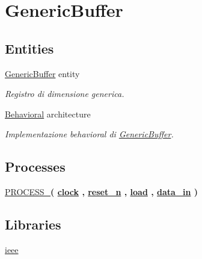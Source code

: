 \hypertarget{group___generic_buffer}{}\section{Generic\+Buffer}
\label{group___generic_buffer}
\subsection*{Entities}
\begin{DoxyCompactItemize}
\item 
\hyperlink{class_generic_buffer}{Generic\+Buffer} entity
\begin{DoxyCompactList}\small\item\em Registro di dimensione generica. \end{DoxyCompactList}\item 
\hyperlink{class_generic_buffer_1_1_behavioral}{Behavioral} architecture
\begin{DoxyCompactList}\small\item\em Implementazione behavioral di \hyperlink{class_generic_buffer}{Generic\+Buffer}. \end{DoxyCompactList}\end{DoxyCompactItemize}
\subsection*{Processes}
 \begin{DoxyCompactItemize}
\item 
\hyperlink{group___generic_buffer_ga2ee480e118ca2b3fccf26139a66e84ad}{P\+R\+O\+C\+E\+S\+S\+\_}{\bfseries  ( {\bfseries {\bfseries \hyperlink{group___generic_buffer_gadfc2d5e995e9c6876b2e55bf6a5c4071}{clock}} \textcolor{vhdlchar}{ }} , {\bfseries {\bfseries \hyperlink{group___generic_buffer_ga446ea52ed8c4a84181a47d9165ce41a5}{reset\+\_\+n}} \textcolor{vhdlchar}{ }} , {\bfseries {\bfseries \hyperlink{group___generic_buffer_gaba761f7740d0b6257a0e283b3734ddbf}{load}} \textcolor{vhdlchar}{ }} , {\bfseries {\bfseries \hyperlink{group___generic_buffer_ga597910698848749da5951285c85fa4f9}{data\+\_\+in}} \textcolor{vhdlchar}{ }} )}
\end{DoxyCompactItemize}
\subsection*{Libraries}
 \begin{DoxyCompactItemize}
\item 
\hyperlink{group___generic_buffer_ga0a6af6eef40212dbaf130d57ce711256}{ieee} 
\end{DoxyCompactItemize}
